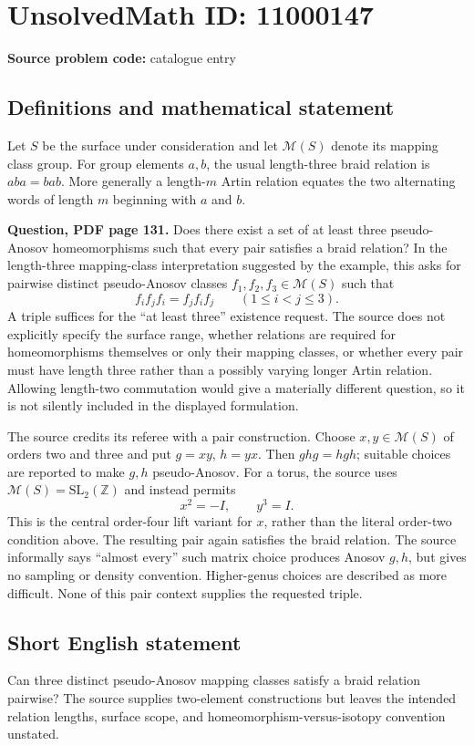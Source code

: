 \documentclass[11pt]{article}
\newcommand{\Z}{\mathbb{Z}}
\begin{document}
\section*{UnsolvedMath ID: 11000147}
\textbf{Source problem code:} catalogue entry
\subsection{Definitions and mathematical statement}
Let $S$ be the surface under consideration and let $\mathcal M(S)$ denote its mapping class group. For group elements $a,b$, the usual length-three braid relation is $aba=bab$. More generally a length-$m$ Artin relation equates the two alternating words of length $m$ beginning with $a$ and $b$.

\textbf{Question, PDF page 131.} Does there exist a set of at least three pseudo-Anosov homeomorphisms such that every pair satisfies a braid relation? In the length-three mapping-class interpretation suggested by the example, this asks for pairwise distinct pseudo-Anosov classes $f_1,f_2,f_3\in\mathcal M(S)$ such that
\[
 f_if_jf_i=f_jf_if_j\qquad(1\le i<j\le3).
\]
A triple suffices for the ``at least three'' existence request. The source does not explicitly specify the surface range, whether relations are required for homeomorphisms themselves or only their mapping classes, or whether every pair must have length three rather than a possibly varying longer Artin relation. Allowing length-two commutation would give a materially different question, so it is not silently included in the displayed formulation.

The source credits its referee with a pair construction. Choose $x,y\in\mathcal M(S)$ of orders two and three and put $g=xy$, $h=yx$. Then $ghg=hgh$; suitable choices are reported to make $g,h$ pseudo-Anosov. For a torus, the source uses $\mathcal M(S)=\mathrm{SL}_2(\Z)$ and instead permits
\[
 x^2=-I,\qquad y^3=I.
\]
This is the central order-four lift variant for $x$, rather than the literal order-two condition above. The resulting pair again satisfies the braid relation. The source informally says ``almost every'' such matrix choice produces Anosov $g,h$, but gives no sampling or density convention. Higher-genus choices are described as more difficult. None of this pair context supplies the requested triple.
\subsection{Short English statement}
Can three distinct pseudo-Anosov mapping classes satisfy a braid relation pairwise? The source supplies two-element constructions but leaves the intended relation lengths, surface scope, and homeomorphism-versus-isotopy convention unstated.
\end{document}
